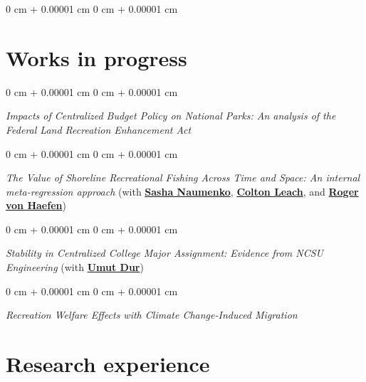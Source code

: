 \documentclass[12pt]{article}
\newenvironment{onecolentry}{
	\begin{adjustwidth}{
			0 cm + 0.00001 cm
		}{
			0 cm + 0.00001 cm
		}
	}
	{
	\end{adjustwidth}
} %
\newenvironment{paper}{
	\begin{onecolentry}
	\begin{hangingpar}
}{
	\end{hangingpar}
	\end{onecolentry}
	\smallskip
} %
\begin{document}
\begin{paper}
\section{Works in progress}

\begin{paper}
	\emph{Impacts of Centralized Budget Policy on National Parks: An analysis of the Federal Land Recreation Enhancement Act}
\end{paper}

\begin{paper}
	\emph{The Value of Shoreline Recreational Fishing Across Time and Space: An internal meta-regression approach} (with \href{https://www.linkedin.com/in/avn-econ}{\textbf{Sasha Naumenko}}, \href{https://www.linkedin.com/in/colton-leach-54a080136}{\textbf{Colton Leach}}, and \href{https://rvhaefen.wordpress.ncsu.edu/}{\textbf{Roger von Haefen}})
\end{paper}

\begin{paper}
	\emph{Stability in Centralized College Major Assignment: Evidence from NCSU Engineering} (with \href{https://sites.google.com/site/umutdur/}{\bfseries Umut Dur})
\end{paper}


\begin{paper}
	\emph{Recreation Welfare Effects with Climate Change-Induced Migration}
\end{paper}

\section{Research experience}


\end{paper}
\end{document}
